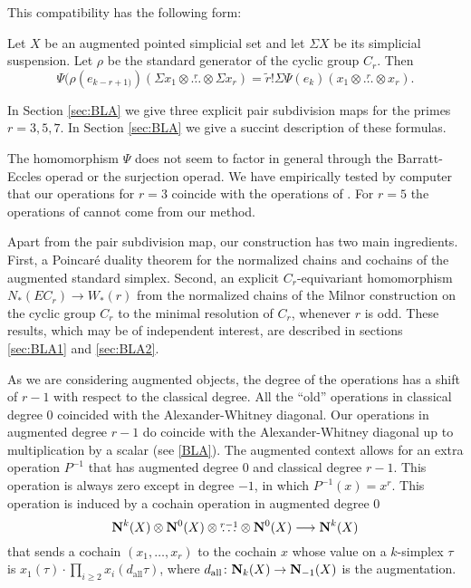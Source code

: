 This compatibility has the following form:
\begin{theorem}
 Let $X$ be an augmented pointed simplicial set and let $\Sigma X$ be its simplicial suspension. Let $\rho$ be the standard generator of the cyclic group $C_r$. Then 
\[\Psi(\rho(e_{k-r+1)})(\Sigma x_1\otimes\overset{r}{\ldots}\otimes \Sigma x_r) = \tilde{r}!\Sigma\Psi(e_{k})(x_1\otimes \overset{r}{\ldots} \otimes x_r).
\]
\end{theorem}

In Section \ref{sec:BLA} we give three explicit pair subdivision maps for the primes $r=3,5,7$. In Section \ref{sec:BLA} we give a succint description of these formulas. 

The homomorphism $\Psi$ does not seem to factor in general through the Barratt-Eccles operad or the surjection operad. We have empirically tested by computer that our operations for $r=3$ coincide with the operations of \cite{Anibaletal}. For $r=5$ the operations of \cite{Anibaletal} cannot come from our method. 

Apart from the pair subdivision map, our construction has two main ingredients. First, a Poincaré duality theorem for the normalized chains and cochains of the augmented standard simplex. Second, an explicit $C_r$-equivariant homomorphism $N_*(EC_r)\to W_*(r)$ from the normalized chains of the Milnor construction on the cyclic group $C_r$ to the minimal resolution of $C_r$, whenever $r$ is odd. These results, which may be of independent interest, are described in sections \ref{sec:BLA1} and \ref{sec:BLA2}.

As we are considering augmented objects, the degree of the operations has a shift of $r-1$ with respect to the classical degree. All the ``old'' operations in classical degree $0$ coincided with the Alexander-Whitney diagonal. Our operations in augmented degree $r-1$ do coincide with the Alexander-Whitney diagonal up to multiplication by a scalar (see \ref{BLA}). The augmented context allows for an extra operation $P^{-1}$ that has augmented degree $0$ and classical degree $r-1$. This operation is always zero except in degree $-1$, in which $P^{-1}(x) = x^r$. This operation is induced by a cochain operation in augmented degree $0$
\[\mathbf{N}^{k}(X)\otimes \mathbf{N}^{0}(X)\otimes\overset{r-1}{\ldots}\otimes \mathbf{N}^{0}(X)\longrightarrow \mathbf{N}^{k}(X)\]
that sends a cochain $(x_1,\ldots,x_r)$ to the cochain $x$ whose value on a $k$-simplex $\tau$ is $x_1(\tau)\cdot \prod_{i\geq 2} x_i(d_{\mathrm{all}}\tau)$, where $d_{\mathrm{all}}\colon \mathbf{N}_k(X)\to \mathbf{N}_{-1}(X)$ is the augmentation. 

